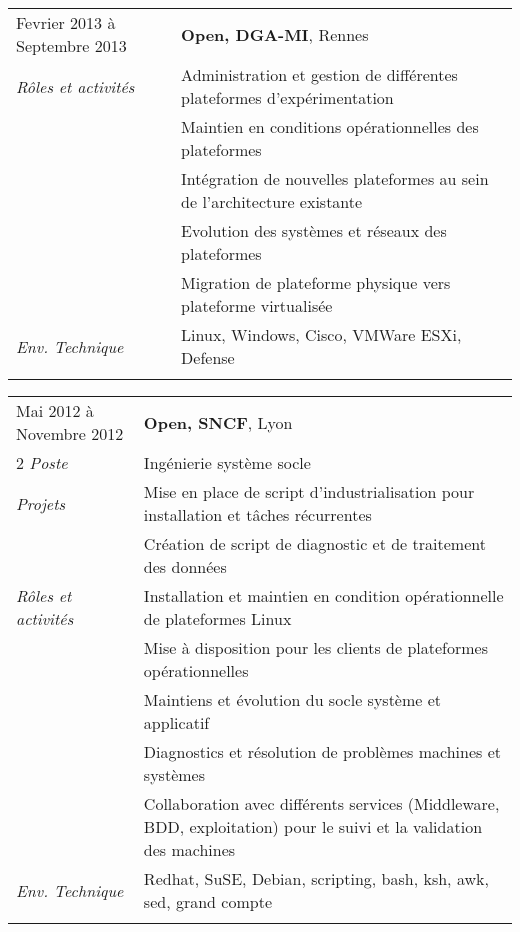\documentclass[a4paper]{article}
\begin{document}
\begin{tabular}{P{3.5cm}|p{13cm}}
Fevrier 2013 à Septembre 2013	& \textbf{Open, DGA-MI}, Rennes\\
\textsl{Rôles et activités}	& Administration et gestion de différentes plateformes d'expérimentation\\
				& Maintien en conditions opérationnelles des plateformes\\
				& Intégration de nouvelles plateformes au sein de l'architecture existante\\
				& Evolution des systèmes et réseaux des plateformes\\
				& Migration de plateforme physique vers plateforme virtualisée\\
\textsl{Env. Technique}		& Linux, Windows, Cisco, VMWare ESXi, Defense\\
 & \\
\end{tabular}

\begin{tabular}{P{3.5cm}|p{13cm}}
Mai 2012 à Novembre 2012	& \textbf{Open, SNCF}, Lyon\\2
\textsl{Poste}			& Ingénierie système socle\\
\textsl{Projets}		& Mise en place de script d'industrialisation pour installation et tâches récurrentes\\
				& Création de script de diagnostic et de traitement des données\\
\textsl{Rôles et activités}	& Installation et maintien en condition opérationnelle de plateformes Linux\\
				& Mise à disposition pour les clients de plateformes opérationnelles\\
				& Maintiens et évolution du socle système et applicatif\\
				& Diagnostics et résolution de problèmes machines et systèmes\\
				& Collaboration avec différents services (Middleware, BDD, exploitation) pour le suivi et la validation des machines\\
\textsl{Env. Technique}		& Redhat, SuSE, Debian, scripting, bash, ksh, awk, sed, grand compte\\
 & \\
\end{tabular}
\end{document}
